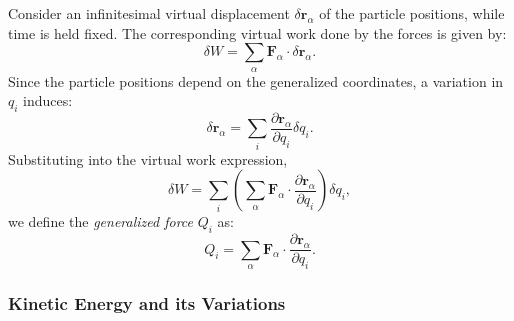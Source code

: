 Consider an infinitesimal virtual displacement \(\delta \mathbf{r}_\alpha\) of the particle positions, while time is held fixed. The corresponding virtual work done by the forces is given by:
\begin{equation}
    \delta W = \sum_\alpha \mathbf{F}_\alpha \cdot \delta \mathbf{r}_\alpha.
\end{equation}
Since the particle positions depend on the generalized coordinates, a variation in \(q_i\) induces:
\begin{equation} \label{eq:virtual_disp}
    \delta \mathbf{r}_\alpha = \sum_{i} \frac{\partial \mathbf{r}_\alpha}{\partial q_i}\delta q_i.
\end{equation}
Substituting into the virtual work expression,
\begin{equation}
    \delta W = \sum_{i} \left(\sum_\alpha \mathbf{F}_\alpha \cdot \frac{\partial \mathbf{r}_\alpha}{\partial q_i}\right)\delta q_i,
\end{equation}
we define the \emph{generalized force} \(Q_i\) as:
\begin{equation}
    Q_i = \sum_\alpha \mathbf{F}_\alpha \cdot \frac{\partial \mathbf{r}_\alpha}{\partial q_i}.
\end{equation}

\subsubsection*{Kinetic Energy and its Variations}

